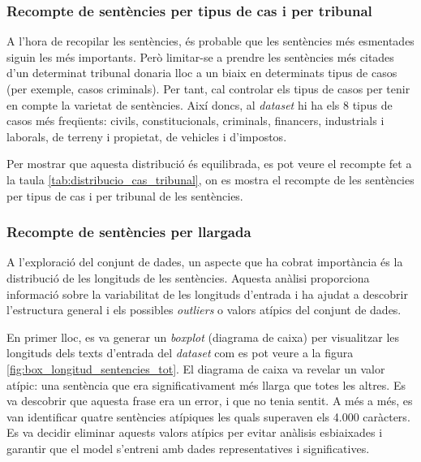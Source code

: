 \subsubsection{Recompte de sentències per tipus de cas i per tribunal}
A l'hora de recopilar les sentències, és probable que les sentències més esmentades siguin les més importants. Però limitar-se a prendre les sentències més citades d'un determinat tribunal donaria lloc a un biaix en determinats tipus de casos (per exemple, casos criminals). Per tant, cal controlar els tipus de casos per tenir en compte la varietat de sentències. Així doncs, al \textit{dataset} hi ha els 8 tipus de casos més freqüents: civils, constitucionals, criminals, financers, industrials i laborals, de terreny i propietat, de vehicles i d'impostos.

Per mostrar que aquesta distribució és equilibrada, es pot veure el recompte fet a la taula \ref{tab:distribucio_cas_tribunal}, on es mostra el recompte de les sentències per tipus de cas i per tribunal de les sentències.


\subsubsection{Recompte de sentències per llargada}
A l'exploració del conjunt de dades, un aspecte que ha cobrat importància és la distribució de les longituds de les sentències. Aquesta anàlisi proporciona informació sobre la variabilitat de les longituds d'entrada i ha ajudat a descobrir l'estructura general i els possibles \textit{outliers} o valors atípics del conjunt de dades.

En primer lloc, es va generar un \textit{boxplot} (diagrama de caixa) per visualitzar les longituds dels texts d'entrada del \textit{dataset} com es pot veure a la figura \ref{fig:box_longitud_sentencies_tot}. El diagrama de caixa va revelar un valor atípic: una sentència que era significativament més llarga que totes les altres. Es va descobrir que aquesta frase era un error, i que no tenia sentit. A més a més, es van identificar quatre sentències atípiques les quals superaven els 4.000 caràcters. Es va decidir eliminar aquests valors atípics per evitar anàlisis esbiaixades i garantir que el model s'entreni amb dades representatives i significatives.

